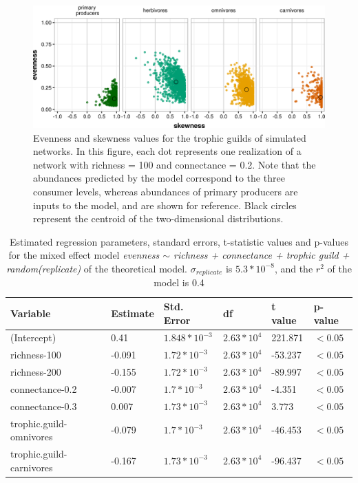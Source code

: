 \begin{figure}[htbp!]
\includegraphics[width=\textwidth,height=\textheight,keepaspectratio]{./Figures/chapter04/Fig_3.png}
\caption[Model evenness and skewness]{\color{Gray}Evenness and skewness values for the trophic guilds of simulated networks. In this figure, each dot represents one realization of a network with richness = 100 and connectance = 0.2. Note that the abundances predicted by the model correspond to the three consumer levels, whereas abundances of primary producers are inputs to the model, and are shown for reference. Black circles represent the centroid of the two-dimensional distributions.}\label{fig:fig4.3}
\end{figure}

\begin{table}[ht!]
\centering
\caption[Coefficients from evenness regression in simulated networks]{\color{Gray}Estimated regression parameters, standard errors, t-statistic values and p-values for the mixed effect model \textit{evenness $\sim$ richness + connectance + trophic guild + random(replicate)} of the theoretical model. $\sigma_{replicate}$ is $5.3*10^{-8}$, and the $r^2$ of the model is 0.4}\label{tab:tab4.1}
\begin{tabular}{llllll}
\hline
Variable & Estimate & Std. Error &         df & t value & p-value \\
\hline
(Intercept)            &  0.41 & $1.848*10^{-3}$ & $2.63*10^{4}$ & 221.871 & $<0.05$ \\
richness-100      & -0.091 & $1.72*10^{-3}$ &  $2.63*10^{4}$ & -53.237 & $<0.05$ \\
richness-200      & -0.155 & $1.72*10^{-3}$ &  $2.63*10^{4}$ & -89.997 & $<0.05$ \\
connectance-0.2   & -0.007 & $1.7*10^{-3}$ &  $2.63*10^{4}$ & -4.351 & $<0.05$ \\
connectance-0.3   &  0.007 & $1.73*10^{-3}$ &  $2.63*10^{4}$ & 3.773 & $<0.05$ \\
trophic.guild-omnivores & -0.079 & $1.7*10^{-3}$ & $2.63*10^{4}$ & -46.453 & $<0.05$ \\
trophic.guild-carnivores & -0.167 & $1.73*10^{-3}$ & $2.63*10^{4}$ & -96.437 & $<0.05$ \\
\hline
\end{tabular}

\end{table}

